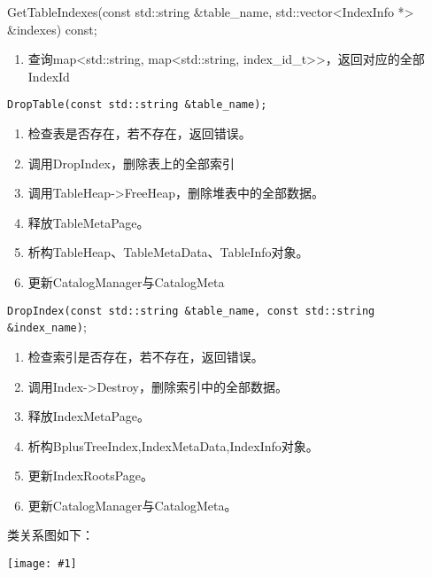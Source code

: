 \documentclass[12pt, a4paper]{article}
\def\c#1{\texttt{#1}}
\def\p{\par}
\def\g#1{\begin{center}\texttt{[image: \#1]}\end{center}}
\begin{document}
\begin{itemize}
{  \item GetTableIndexes(const std::string \&table\_name, std::vector<IndexInfo *> \&indexes) const;}\begin{enumerate}
    \item 查询map<std::string, map<std::string, index\_id\_t>>，返回对应的全部IndexId
  \end{enumerate}
  \item \c{DropTable(const std::string \&table\_name);}\begin{enumerate}
    \item 检查表是否存在，若不存在，返回错误。
    \item 调用DropIndex，删除表上的全部索引
    \item 调用TableHeap->FreeHeap，删除堆表中的全部数据。
    \item 释放TableMetaPage。
    \item 析构TableHeap、TableMetaData、TableInfo对象。
    \item 更新CatalogManager与CatalogMeta
  \end{enumerate}
  \item \c{DropIndex(const std::string \&table\_name, const std::string \&index\_name)};\begin{enumerate}
    \item 检查索引是否存在，若不存在，返回错误。
    \item 调用Index->Destroy，删除索引中的全部数据。
    \item 释放IndexMetaPage。
    \item 析构BplusTreeIndex,IndexMetaData,IndexInfo对象。
    \item 更新IndexRootsPage。
    \item 更新CatalogManager与CatalogMeta。
  \end{enumerate}
\end{itemize}
\p 类关系图如下：
\g{dots/catalog_manager.pdf}
\end{document}

